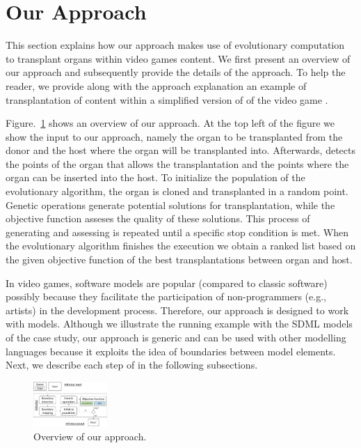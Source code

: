 \section{Our \ApproachName{} Approach} 
\label{sec:Approach}

This section explains how our \ApproachName{} approach makes use of evolutionary computation to transplant organs within video games content. We first present an overview of our approach and subsequently provide the details of the approach. To help the reader, we provide along with the approach explanation an example of transplantation of content within a simplified version of  of the video game \CaseStudy{}.

Figure.~\ref{fig:approach} shows an overview of our approach.
At the top left of the figure we show the input to our approach, namely the organ to be transplanted from the donor and the host where the organ will be transplanted into. Afterwards, \ApproachName{} detects the points of the organ that allows the transplantation and the points where the organ can be inserted into the host. To initialize the population of the evolutionary algorithm, the organ is cloned and transplanted in a random point. Genetic operations generate potential solutions for transplantation, while the objective function asseses the quality of these solutions. This process of generating and assessing is repeated until a specific stop condition is met. When the evolutionary algorithm finishes the execution we obtain a ranked list based on the given objective function of the best transplantations between organ and host.

In video games, software models are popular (compared to classic software) possibly because they facilitate the participation of non-programmers (e.g., artists) in the development process. Therefore, our \ApproachName{} approach is designed to work with models. Although we illustrate the running example with the SDML models of the case study, our approach is generic and can be used with other modelling languages because it exploits the idea of boundaries between model elements.
Next, we describe each step of \ApproachName{} in the following subsections.

\begin{figure}[tb]
    \centering
    \includegraphics[width=0.25\textwidth]{Figures/overview.png}
    \caption{Overview of our \ApproachName{} approach.}
    \label{fig:approach}
\end{figure}


